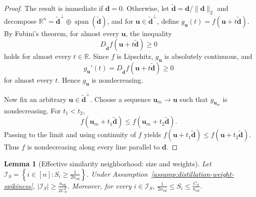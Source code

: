 \documentclass[12pt]{article}
\newtheorem{lemma}{Lemma}
\theoremstyle{definition}
\begin{document}
\begin{proof}
The result is immediate if $\boldsymbol d=0$. Otherwise, let
$\widetilde{\boldsymbol d}=\boldsymbol d/\|\boldsymbol d\|_2$ and decompose
$\mathbb R^n=\widetilde{\boldsymbol d}^\perp\oplus\operatorname{span}(\widetilde{\boldsymbol d})$, and for $\boldsymbol u\in\widetilde{\boldsymbol d}^\perp$, define $g_{\boldsymbol u}(t)=f(\boldsymbol u+t\widetilde{\boldsymbol d})$.
By Fubini's theorem, for almost every $\boldsymbol u$, the inequality
\[
    D_{\widetilde{\boldsymbol d}}f(\boldsymbol u+t\widetilde{\boldsymbol d})\ge0
\]
holds for almost every $t\in\mathbb R$. Since $f$ is Lipschitz,
$g_{\boldsymbol u}$ is absolutely continuous, and
\[
    g_{\boldsymbol u}'(t)
    =
    D_{\widetilde{\boldsymbol d}}f(\boldsymbol u+t\widetilde{\boldsymbol d})
    \ge0
\]
for almost every $t$. Hence $g_{\boldsymbol u}$ is nondecreasing.

Now fix an arbitrary $\boldsymbol u\in\widetilde{\boldsymbol d}^\perp$. Choose a sequence
$\boldsymbol u_m\to \boldsymbol u$ such that $g_{\boldsymbol u_m}$ is nondecreasing. For $t_1<t_2$,
\[
    f(\boldsymbol u_m+t_1\widetilde{\boldsymbol d})
    \le
    f(\boldsymbol u_m+t_2\widetilde{\boldsymbol d}).
\]
Passing to the limit and using continuity of $f$ yields $f(\boldsymbol u+t_1\widetilde{\boldsymbol d})\le f(\boldsymbol u+t_2\widetilde{\boldsymbol d})$.
Thus $f$ is nondecreasing along every line parallel to $\boldsymbol d$.
\end{proof}

\begin{lemma}[Effective similarity neighborhood: size and weights]
\label{lem:distillation-effective-neighborhood-size}
Let $\mathcal I_S=\left\{i\in[n]:S_i\ge\frac{1}{2n_{\mathrm{eff}}}\right\}$.
Under Assumption~\ref{assump:distillation-weight-spikiness}, $|\mathcal I_S| \ge \frac{n_{\mathrm{eff}}}{2C_S^2}$.
Moreover, for every $i\in\mathcal I_S$, $\frac{1}{2n_{\mathrm{eff}}}\le S_i\le
\frac{C_S}{n_{\mathrm{eff}}}$.
\end{lemma}
\end{document}
